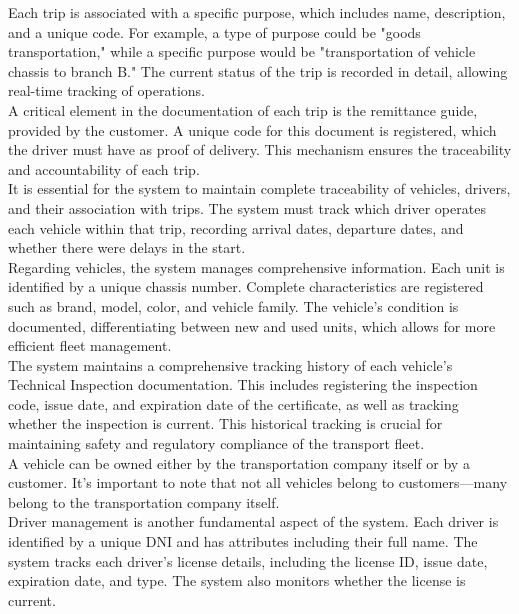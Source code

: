 \documentclass[11pt, a4paper]{article}
\begin{document}
Each trip is associated with a specific purpose, which includes name, description, and a unique code. For example, a type of purpose could be "goods transportation," while a specific purpose would be "transportation of vehicle chassis to branch B." The current status of the trip is recorded in detail, allowing real-time tracking of operations.\\

A critical element in the documentation of each trip is the remittance guide, provided by the customer. A unique code for this document is registered, which the driver must have as proof of delivery. This mechanism ensures the traceability and accountability of each trip.\\

It is essential for the system to maintain complete traceability of vehicles, drivers, and their association with trips. The system must track which driver operates each vehicle within that trip, recording arrival dates, departure dates, and whether there were delays in the start.\\

Regarding vehicles, the system manages comprehensive information. Each unit is identified by a unique chassis number. Complete characteristics are registered such as brand, model, color, and vehicle family. The vehicle's condition is documented, differentiating between new and used units, which allows for more efficient fleet management.\\

The system maintains a comprehensive tracking history of each vehicle's Technical Inspection documentation. This includes registering the inspection code, issue date, and expiration date of the certificate, as well as tracking whether the inspection is current. This historical tracking is crucial for maintaining safety and regulatory compliance of the transport fleet.\\

A vehicle can be owned either by the transportation company itself or by a customer. It's important to note that not all vehicles belong to customers—many belong to the transportation company itself.\\

Driver management is another fundamental aspect of the system. Each driver is identified by a unique DNI and has attributes including their full name. The system tracks each driver's license details, including the license ID, issue date, expiration date, and type. The system also monitors whether the license is current.\\
\end{document}
